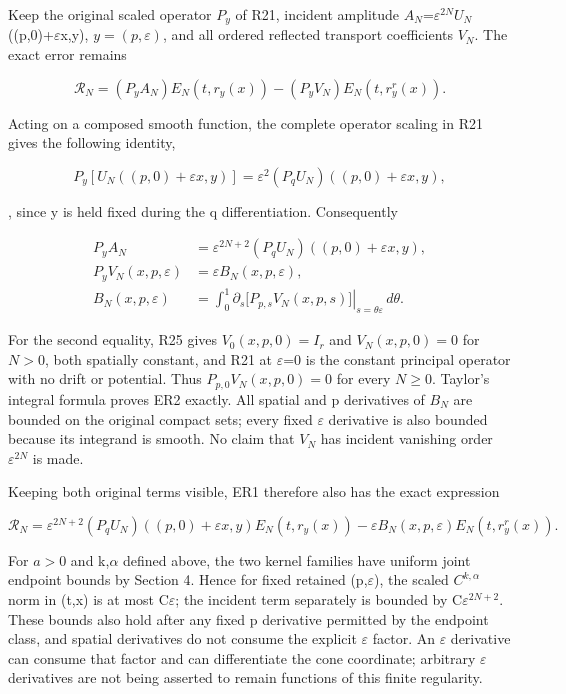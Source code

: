\documentclass[
  11pt,
]{article}
\begin{document}
Keep the original scaled operator \(P_y\) of R21, incident amplitude
\(A_N\)=\(\varepsilon ^{2N}\)\(U_N\)((p,0)+\ensuremath{\varepsilon}x,y),
\(y=(p,\varepsilon )\), and all ordered reflected transport coefficients
\(V_N\). The exact error remains

\[
 \mathcal R_N=(P_yA_N)E_N(t,r_y(x))
                -(P_yV_N)E_N(t,r_y^r(x)).
 \tag{ER1}
\]

Acting on a composed smooth function, the complete operator scaling in
R21 gives the following identity,

\[
 P_y[U_N((p,0)+\varepsilon x,y)]
 =\varepsilon^2(P_qU_N)((p,0)+\varepsilon x,y),
\]

, since y is held fixed during the q differentiation. Consequently

\[
 \begin{split}
 P_yA_N&=\varepsilon^{2N+2}(P_qU_N)((p,0)+\varepsilon x,y),\\
 P_yV_N(x,p,\varepsilon)&=\varepsilon B_N(x,p,\varepsilon),\\
 B_N(x,p,\varepsilon)&=\int_0^1
   \left.\partial_s\big[P_{p,s}V_N(x,p,s)\big]
                                    \right|_{s=\theta\varepsilon}\,d\theta.
 \end{split}
 \tag{ER2}
\]

For the second equality, R25 gives \(V_0(x,p,0)=I_r\) and
\(V_N(x,p,0)=0\) for \(N>0\), both spatially constant, and R21 at \ensuremath{\varepsilon}=0 is
the constant principal operator with no drift or potential. Thus
\(P_{p,0}V_N(x,p,0)=0\) for every \(N\geq 0\). Taylor's integral formula
proves ER2 exactly. All spatial and p derivatives of \(B_N\) are bounded
on the original compact sets; every fixed \ensuremath{\varepsilon} derivative is also bounded
because its integrand is smooth. No claim that \(V_N\) has incident
vanishing order \(\varepsilon ^{2N}\) is made.

Keeping both original terms visible, ER1 therefore also has the exact
expression

\[
 \mathcal R_N=\varepsilon^{2N+2}(P_qU_N)((p,0)+\varepsilon x,y)
                         E_N(t,r_y(x))
       -\varepsilon B_N(x,p,\varepsilon)E_N(t,r_y^r(x)).
 \tag{ER3}
\]

For \(a>0\) and k,\ensuremath{\alpha} defined above, the two kernel families have uniform
joint endpoint bounds by Section 4. Hence for fixed retained (p,\ensuremath{\varepsilon}), the
scaled \(C^{k,\alpha }\) norm in (t,x) is at most C\ensuremath{\varepsilon}; the incident term
separately is bounded by C\(\varepsilon ^{2N+2}\). These bounds also
hold after any fixed p derivative permitted by the endpoint class, and
spatial derivatives do not consume the explicit \ensuremath{\varepsilon} factor. An \ensuremath{\varepsilon}
derivative can consume that factor and can differentiate the cone
coordinate; arbitrary \ensuremath{\varepsilon} derivatives are not being asserted to remain
functions of this finite regularity.
\end{document}
